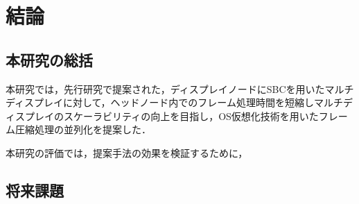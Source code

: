 \chapter{結論}

\section{本研究の総括}
本研究では，先行研究で提案された，ディスプレイノードにSBCを用いたマルチディスプレイに対して，ヘッドノード内でのフレーム処理時間を短縮しマルチディスプレイのスケーラビリティの向上を目指し，OS仮想化技術を用いたフレーム圧縮処理の並列化を提案した．


本研究の評価では，提案手法の効果を検証するために，

\section{将来課題}